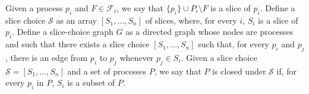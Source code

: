 \documentclass[11pt]{article}
\begin{document}
Given a process $p_i$ and $F\in \mathcal{F}_i$, we say that $\{p_i\}\cup P_i\setminus F$ is a slice of $p_i$.
Define a slice choice $\mathcal{S}$ as an array $\left[S_1,...,S_n\right]$ of slices, where, for every $i$, $S_i$ is a slice of $p_i$.
Define a slice-choice graph $G$ as a directed graph whose nodes are processes and such that there exists a slice choice $\left[S_1,...,S_n\right]$ such that, for every $p_i$ and $p_j$, there is an edge from $p_i$ to $p_j$ whenever $p_j\in S_i$.
Given a slice choice $\mathcal{S}=\left[S_1,...,S_n\right]$ and a set of processes $P$, we say that $P$ is closed under $\mathcal{S}$ if, for every $p_i$ in $P$, $S_i$ is a subset of $P$.





\end{document}
